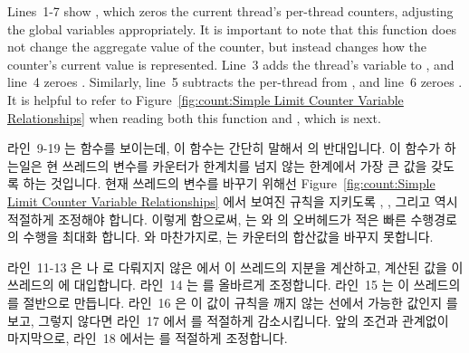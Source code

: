 Lines~1-7 show , which zeros the current thread's
per-thread counters, adjusting the global variables appropriately.
It is important to note that this function does not change the aggregate
value of the counter, but instead changes how the counter's current value
is represented.
Line~3 adds the thread's  variable to ,
and line~4 zeroes .
Similarly, line~5 subtracts the per-thread  from
, and line~6 zeroes .
It is helpful to refer to
Figure~\ref{fig:count:Simple Limit Counter Variable Relationships}
when reading both this function and , which is next.
\fi

라인~9-19 는  함수를 보이는데, 이 함수는 간단히 말해서
 의 반대입니다.
이 함수가 하는일은 현 쓰레드의  변수를 카운터가
 한계치를 넘지 않는 한계에서 가장 큰 값을 갖도록 하는
것입니다.
현재 쓰레드의  변수를 바꾸기 위해선
Figure~\ref{fig:count:Simple Limit Counter Variable Relationships} 에서 보여진
규칙을 지키도록 , , 그리고  역시
적절하게 조정해야 합니다.
이렇게 함으로써,  는  와 
의 오버헤드가 적은 빠른 수행경로의 수행을 최대화 합니다.
 와 마찬가지로,  는 카운터의 합산값을
바꾸지 못합니다.

라인~11-13 은  나  로 다뤄지지 않은
 에서 이 쓰레드의 지분을 계산하고, 계산된 값을 이 쓰레드의
 에 대입합니다.
라인~14 는  를 올바르게 조정합니다.
라인~15 는 이 쓰레드의  를  절반으로 만듭니다.
라인~16 은 이  값이 규칙을 깨지 않는 선에서 가능한 값인지
 를 보고, 그렇지 않다면 라인~17 에서  를 적절하게
감소시킵니다.
앞의 조건과 관계없이 마지막으로, 라인~18 에서는  를 적절하게
조정합니다.
\iffalse

